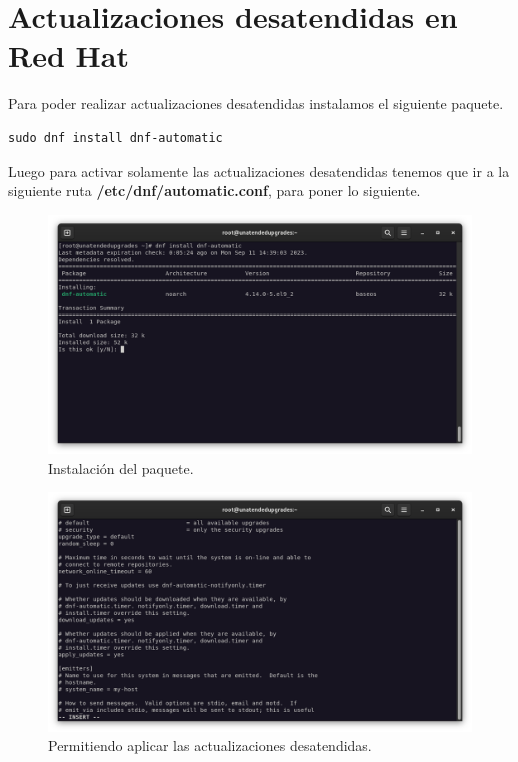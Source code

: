 \section{Actualizaciones desatendidas en Red Hat}

Para poder realizar actualizaciones desatendidas instalamos el siguiente paquete.
\begin{lstlisting}[style=mybash]
sudo dnf install dnf-automatic
\end{lstlisting}

Luego para activar solamente las actualizaciones desatendidas tenemos que ir a la siguiente ruta \textbf{/etc/dnf/automatic.conf}, para poner lo siguiente.

\begin{figure}[H]
	\centering
	\includegraphics[scale=0.30]{00}
	\caption{Instalación del paquete.}
\end{figure}

\begin{figure}[H]
	\centering
	\includegraphics[scale=0.30]{01}
	\caption{Permitiendo aplicar las actualizaciones desatendidas.}
\end{figure}

